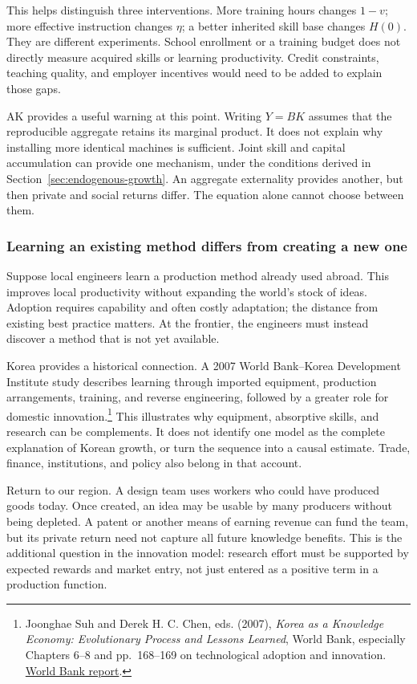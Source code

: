 This helps distinguish three interventions. More training hours changes
$1-v$; more effective instruction changes $\eta$; a better inherited skill
base changes $H(0)$. They are different experiments. School enrollment or a
training budget does not directly measure acquired skills or learning
productivity. Credit constraints, teaching quality, and employer incentives
would need to be added to explain those gaps.

AK provides a useful warning at this point. Writing $Y=BK$ assumes that
the reproducible aggregate retains its marginal product. It does not explain
why installing more identical machines is sufficient. Joint skill and capital
accumulation can provide one mechanism, under the conditions derived in
Section~\ref{sec:endogenous-growth}. An aggregate externality provides
another, but then private and social returns differ. The equation alone
cannot choose between them.

\subsubsection{Learning an existing method differs from creating a new one}

Suppose local engineers learn a production method already used abroad.
This improves local productivity without expanding the world's stock of
ideas. Adoption requires capability and often costly adaptation; the
distance from existing best practice matters. At the frontier, the engineers
must instead discover a method that is not yet available.

Korea provides a historical connection. A 2007 World Bank--Korea Development
Institute study describes learning through imported equipment, production
arrangements, training, and reverse engineering, followed by a greater role
for domestic innovation.\footnote{Joonghae Suh and Derek H. C. Chen, eds.
(2007), \textit{Korea as a Knowledge Economy: Evolutionary Process and
Lessons Learned}, World Bank, especially Chapters 6--8 and pp.~168--169
on technological adoption and innovation.
\href{https://documents1.worldbank.org/curated/en/923361468327364601/pdf/409300PAPER0KR101OFFICIAL0USE0ONLY1.pdf}{World Bank report}.}
This illustrates why equipment, absorptive skills, and research can be
complements. It does not identify one model as the complete explanation of
Korean growth, or turn the sequence into a causal estimate. Trade, finance,
institutions, and policy also belong in that account.

Return to our region. A design team uses workers who could have produced
goods today. Once created, an idea may be usable by many producers without
being depleted. A patent or another means of earning revenue can fund the
team, but its private return need not capture all future knowledge benefits.
This is the additional question in the innovation model: research effort
must be supported by expected rewards and market entry, not just entered
as a positive term in a production function.

